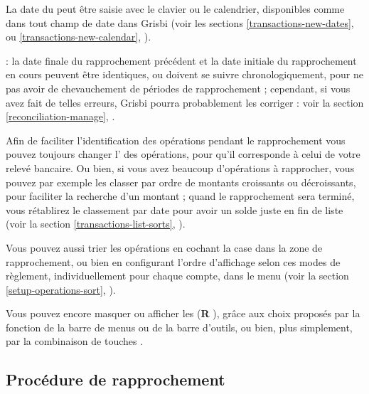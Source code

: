 La date du  peut être saisie avec le clavier ou le calendrier, disponibles comme dans tout champ de date dans Grisbi (voir les sections \vref{transactions-new-dates},  ou \vref{transactions-new-calendar}, ).

 : la date finale du rapprochement précédent et la date initiale du rapprochement en cours peuvent être identiques, ou doivent se suivre chronologiquement, pour ne pas avoir de chevauchement de périodes de rapprochement ; cependant, si vous avez fait de telles erreurs, Grisbi pourra probablement les corriger : voir la section \vref{reconciliation-manage}, .

Afin de faciliter l'identification des opérations pendant le rapprochement vous pouvez toujours changer l' des opérations, pour qu'il corresponde à celui de votre relevé bancaire. Ou bien, si vous avez beaucoup d'opérations à rapprocher, vous pouvez par exemple les classer par ordre de montants croissants ou décroissants, pour faciliter la recherche d'un montant ; quand le rapprochement sera terminé, vous rétablirez le classement par date pour avoir un solde juste en fin de liste (voir la section \vref{transactions-list-sorts}, ).

Vous pouvez aussi trier les opérations en cochant la case  dans la zone de rapprochement, ou bien en configurant l'ordre d'affichage selon ces modes de règlement, individuellement pour chaque compte, dans le menu   (voir la section \vref{setup-operations-sort}, ).

Vous pouvez encore masquer ou afficher les  (\og \textbf{R} \fg{}), grâce aux choix proposés par la fonction  de la barre de menus ou de la barre d'outils, ou bien, plus simplement, par la combinaison de touches . 

\subsection{Procédure de rapprochement\label{reconciliation-account-howto} }


